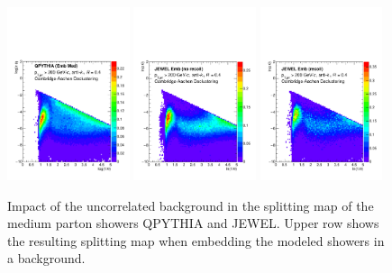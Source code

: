 \begin{figure}
\centering
\includegraphics[width=0.32\textwidth]
{figures/LundMC/QPythiaEmbedded}
\includegraphics[width=0.32\textwidth]
{figures/LundMC/Jewel_MedEmb_RecoilOff}
\includegraphics[width=0.32\textwidth]
{figures/LundMC/Jewel_MedEmb_}\\
\caption{Impact of the uncorrelated background in the splitting map of the medium parton showers QPYTHIA and JEWEL. Upper row shows the resulting splitting map when embedding the modeled showers in a background. 
}
\label{fig:UncorrelatedBkgSignal}
\end{figure}
